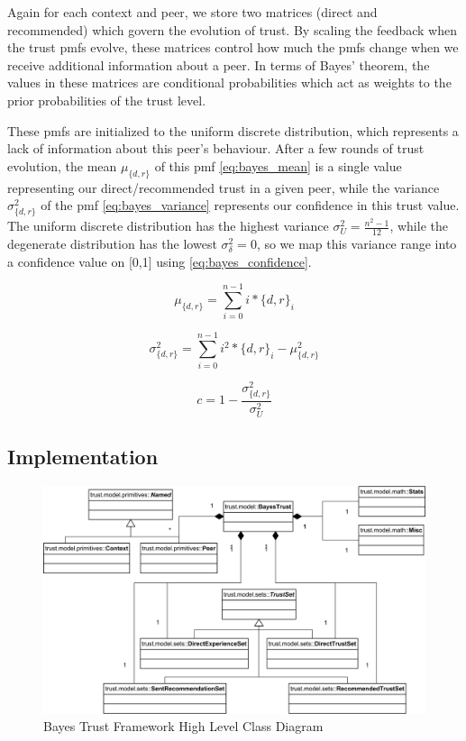 Again for each context and peer, we store two matrices (direct and recommended)
which govern the evolution of trust. By scaling the feedback when the trust
pmfs evolve, these matrices control how much the pmfs change when we receive
additional information about a peer. In terms of Bayes' theorem, the
values in these matrices are conditional probabilities which act as weights
to the prior probabilities of the trust level.

These pmfs are initialized to the uniform discrete distribution, which
represents a lack of information about this peer's behaviour. After a few rounds
of trust evolution, the mean $\mu_{\{d,r\}}$ of this pmf \eqref{eq:bayes_mean}
is a single value representing our direct/recommended trust in a given peer,
while the variance $\sigma^2_{\{d,r\}}$ of the pmf \eqref{eq:bayes_variance}
represents our confidence in this trust value. The uniform discrete distribution
has the highest variance $\sigma^2_U = \frac{n^2-1}{12}$, while the degenerate
distribution has the lowest $\sigma^2_\delta = 0$, so we map this variance range
into a confidence value on [0,1] using \eqref{eq:bayes_confidence}.

\begin{equation}
\label{eq:bayes_mean}
\mu_{\{d,r\}} = \sum_{i=0}^{n-1}{i*{\{d,r\}}_i}
\end{equation}

\begin{equation}
\label{eq:bayes_variance}
\sigma^2_{\{d,r\}} = \sum_{i=0}^{n-1}{i^2*{\{d,r\}}_i} - \mu^2_{\{d,r\}}
\end{equation}

\begin{equation}
\label{eq:bayes_confidence}
c = 1 - \frac{\sigma^2_{\{d,r\}}}{\sigma^2_U}
\end{equation}


\subsection{Implementation}

\begin{figure}[h!]
  \centering
  \includegraphics[width=1\textwidth]{images/bayestrust}
  \caption{Bayes Trust Framework High Level Class Diagram}
  \label{fig:xml2dttest}
\end{figure}

